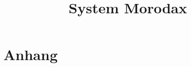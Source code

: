 \documentclass[a4paper]{report}
\begin{document}



\title{System Morodax}


\tableofcontents\newpage






\part{Anhang}
\begin{Beispiele}




\end{Beispiele}
\begin{characterSheets}



\end{characterSheets}
\end{document}

